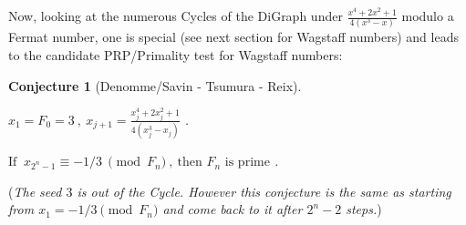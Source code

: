 \documentclass[latin1]{quadrature}
\newtheorem{conjecture}{Conjecture}
\newif\ifenfrancais
\begin{document}
\begin{article}
\begin{article}
\ifenfrancais
Maintenant, si l'on \'etudie les nombreux Cycles du DiGraph sous $\frac{\displaystyle x^4+2x^2+1}{\displaystyle 4(x^3-x)}$ modulo un nombre de Fermat, l'un d'entre eux est sp\'ecial (voir le chapitre suivant sur les nombres de Wagstaff) et laisse imaginer le test de Primalit\'e (ou simplement PRP) pour les nombres de Wagstaff :
\else
Now, looking at the numerous Cycles of the DiGraph under $\frac{\displaystyle x^4+2x^2+1}{\displaystyle 4(x^3-x)}$ modulo a Fermat number, one is special (see next section for Wagstaff numbers) and leads to the candidate PRP/Primality test for Wagstaff numbers:
\fi


\ifenfrancais
\begin{conjecture}[Denomme/Savin - Tsumura - Reix]
\ 
\vspace{.02in}

$x_1=F_0=3 \ , \   x_{j+1} = \frac{\displaystyle x_j^4+2x_j^2+1}{\displaystyle 4(x_j^3-x_j)}$ .

$\text{Si } \ x_{2^{n}-1} \equiv -1/3 \ \pmod{F_n} \ , \ \text{alors } F_n \text{ est premier} $ .
\end{conjecture}
\else
\begin{conjecture}[Denomme/Savin - Tsumura - Reix]
\ 
\vspace{.02in}

$x_1=F_0=3 \ , \   x_{j+1} = \frac{\displaystyle x_j^4+2x_j^2+1}{\displaystyle 4(x_j^3-x_j)}$ .

$\text{If } \ x_{2^{n}-1} \equiv -1/3 \ \pmod{F_n} \ , \ \text{then } F_n \text{ is prime} $ .
\end{conjecture}
\fi


% 
%	



\ifenfrancais
(\emph{La graine $3$ ne fait pas partie du Cycle. Mais cette conjecture est \'equivalente \`a partir de $x_1=-1/3 \pmod{F_n}$ et y revenir apr\`es $2^n-2$ \'etapes.})
\else
(\emph{The seed $3$ is out of the Cycle. However this conjecture is the same as starting from $x_1=-1/3 \pmod{F_n}$ and come back to it after $2^n-2$ steps.})
\fi


\end{article}
\end{article}
\end{document}
